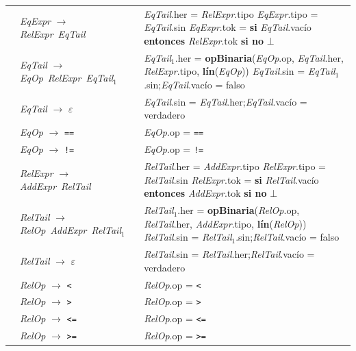 \documentclass[11pt]{article}
\newcommand{\NT}[1]{\textcolor{ntcolor}{\textit{#1}}}            %
\newcommand{\T}[1]{\textcolor{tcolor}{\texttt{#1}}}              %
\newcommand{\A}[2]{\NT{#1}.\textsf{#2}}                          %
\newcommand{\Ax}[3]{\NT{#1}$_{#2}$.\textsf{#3}}                  %
\newcommand{\fn}[1]{\textsf{\textbf{#1}}}                        %
\newcommand{\kw}[1]{\textbf{#1}}                                 %
\begin{document}
{\begin{longtable}{@{}r@{\hspace{6pt}}>{\raggedright\arraybackslash}p{5.6cm}@{\hspace{8pt}}>{\raggedright\arraybackslash}p{9.9cm}@{}}
\addlinespace[2pt]
{(74)} & \NT{EqExpr} $\rightarrow$ \NT{RelExpr}\ \NT{EqTail} & \A{EqTail}{her} = \A{RelExpr}{tipo} \newline \A{EqExpr}{tipo} = \A{EqTail}{sin} \newline \A{EqExpr}{tok} = \kw{si} \A{EqTail}{vacío} \kw{entonces} \A{RelExpr}{tok} \kw{si no} $\bot$ \\
\addlinespace[2pt]
{(75)} & \NT{EqTail} $\rightarrow$ \NT{EqOp}\ \NT{RelExpr}\ \NT{EqTail}$_{1}$ & \Ax{EqTail}{1}{her} = \fn{opBinaria}(\A{EqOp}{op}, \A{EqTail}{her}, \A{RelExpr}{tipo}, \fn{lín}(\NT{EqOp})) \newline \A{EqTail}{sin} = \Ax{EqTail}{1}{sin};\quad \A{EqTail}{vacío} = \textsf{falso} \\
\addlinespace[2pt]
{(76)} & \NT{EqTail} $\rightarrow$ $\varepsilon$ & \A{EqTail}{sin} = \A{EqTail}{her};\quad \A{EqTail}{vacío} = \textsf{verdadero} \\
\addlinespace[2pt]
{(77)} & \NT{EqOp} $\rightarrow$ \T{==} & \A{EqOp}{op} = \T{==} \\
\addlinespace[2pt]
{(78)} & \NT{EqOp} $\rightarrow$ \T{!=} & \A{EqOp}{op} = \T{!=} \\
\addlinespace[2pt]
{(79)} & \NT{RelExpr} $\rightarrow$ \NT{AddExpr}\ \NT{RelTail} & \A{RelTail}{her} = \A{AddExpr}{tipo} \newline \A{RelExpr}{tipo} = \A{RelTail}{sin} \newline \A{RelExpr}{tok} = \kw{si} \A{RelTail}{vacío} \kw{entonces} \A{AddExpr}{tok} \kw{si no} $\bot$ \\
\addlinespace[2pt]
{(80)} & \NT{RelTail} $\rightarrow$ \NT{RelOp}\ \NT{AddExpr}\ \NT{RelTail}$_{1}$ & \Ax{RelTail}{1}{her} = \fn{opBinaria}(\A{RelOp}{op}, \A{RelTail}{her}, \A{AddExpr}{tipo}, \fn{lín}(\NT{RelOp})) \newline \A{RelTail}{sin} = \Ax{RelTail}{1}{sin};\quad \A{RelTail}{vacío} = \textsf{falso} \\
\addlinespace[2pt]
{(81)} & \NT{RelTail} $\rightarrow$ $\varepsilon$ & \A{RelTail}{sin} = \A{RelTail}{her};\quad \A{RelTail}{vacío} = \textsf{verdadero} \\
\addlinespace[2pt]
{(82)} & \NT{RelOp} $\rightarrow$ \T{<} & \A{RelOp}{op} = \T{<} \\
\addlinespace[2pt]
{(83)} & \NT{RelOp} $\rightarrow$ \T{>} & \A{RelOp}{op} = \T{>} \\
\addlinespace[2pt]
{(84)} & \NT{RelOp} $\rightarrow$ \T{<=} & \A{RelOp}{op} = \T{<=} \\
\addlinespace[2pt]
{(85)} & \NT{RelOp} $\rightarrow$ \T{>=} & \A{RelOp}{op} = \T{>=} \\

\end{longtable}}
\end{document}
